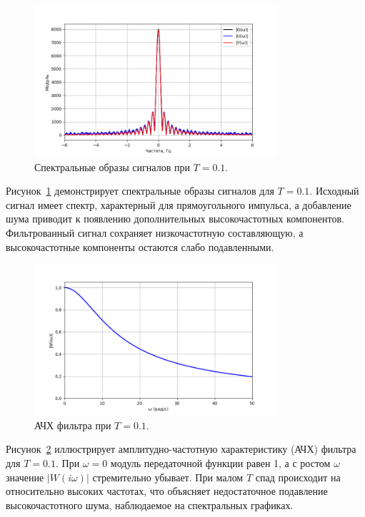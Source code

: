 \documentclass[a4paper]{article}
\begin{document}
\begin{figure}[H]
  \centering
  \includegraphics[width=0.8\textwidth]{src/task_1_1/spec_2.0_0.1.png}
  \caption{Спектральные образы сигналов при \(T=0.1\).}
  \label{fig:spec_0.1}
\end{figure}
\noindent Рисунок~\ref{fig:spec_0.1} демонстрирует спектральные образы сигналов для \(T=0.1\). Исходный сигнал имеет спектр, характерный для прямоугольного импульса, а добавление шума приводит к появлению дополнительных высокочастотных компонентов. Фильтрованный сигнал сохраняет низкочастотную составляющую, а высокочастотные компоненты остаются слабо подавленными.

\begin{figure}[H]
    \centering
    \includegraphics[width=0.8\textwidth]{src/task_1_1/ach_2.0_0.1.png}
    \caption{АЧХ фильтра при \(T=0.1\).}
    \label{fig:ach_0.1}
\end{figure}
\noindent Рисунок~\ref{fig:ach_0.1} иллюстрирует амплитудно-частотную характеристику (АЧХ) фильтра для \(T=0.1\). При \(\omega=0\) модуль передаточной функции равен 1, а с ростом \(\omega\) значение \(|W(i\omega)|\) стремительно убывает. При малом \(T\) спад происходит на относительно высоких частотах, что объясняет недостаточное подавление высокочастотного шума, наблюдаемое на спектральных графиках.
\end{document}
